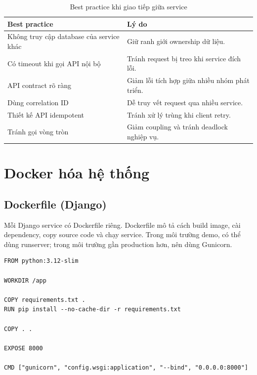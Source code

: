 \documentclass[../main.tex]{subfiles}
\begin{document}
\begin{table}[H]
    \centering
    \caption{Best practice khi giao tiếp giữa service}
    \label{tab:chapter4-service-best-practices}
    \begin{tabular}{|p{}|p{}|}
        \hline
        \rowcolor{primary!35}
        \textbf{Best practice} & \textbf{Lý do} \\
        \hline
        Không truy cập database của service khác & Giữ ranh giới ownership dữ liệu. \\
        \hline
        Có timeout khi gọi API nội bộ & Tránh request bị treo khi service đích lỗi. \\
        \hline
        API contract rõ ràng & Giảm lỗi tích hợp giữa nhiều nhóm phát triển. \\
        \hline
        Dùng correlation ID & Dễ truy vết request qua nhiều service. \\
        \hline
        Thiết kế API idempotent & Tránh xử lý trùng khi client retry. \\
        \hline
        Tránh gọi vòng tròn & Giảm coupling và tránh deadlock nghiệp vụ. \\
        \hline
    \end{tabular}
\end{table}

\section{Docker hóa hệ thống}
\label{section:4.6}

\subsection{Dockerfile (Django)}
\label{subsection:4.6.1}

Mỗi Django service có Dockerfile riêng. Dockerfile mô tả cách build image, cài dependency, copy source code và chạy service. Trong môi trường demo, có thể dùng runserver; trong môi trường gần production hơn, nên dùng Gunicorn.

\begin{lstlisting}[caption={Dockerfile mẫu cho Django service}, label={lst:chapter4-django-dockerfile}]
FROM python:3.12-slim

WORKDIR /app

COPY requirements.txt .
RUN pip install --no-cache-dir -r requirements.txt

COPY . .

EXPOSE 8000

CMD ["gunicorn", "config.wsgi:application", "--bind", "0.0.0.0:8000"]
\end{lstlisting}
\end{document}

